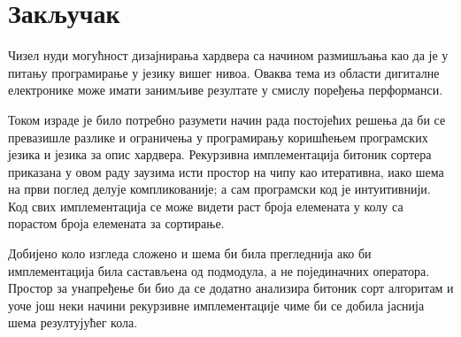 \documentclass[12pt, a4paper]{article}
\theoremstyle{definition}
\begin{document}
\newpage
\section{Закључак}

Чизел нуди могућност дизајнирања хардвера са начином размишљања као да је у питању програмирање у језику вишег нивоа. Оваква тема из области дигиталне електронике може имати занимљиве резултате у смислу поређења перформанси.

Током израде је било потребно разумети начин рада постојећих решења да би се превазишле разлике и ограничења у програмирању коришћењем програмских језика и језика за опис хардвера.
Рекурзивна имплементација битоник сортера приказана у овом раду заузима исти простор на чипу као итеративна, иако шема на први поглед делује компликованије; а сам програмски код је интуитивнији. Код свих имплементација се може видети раст броја елемената у колу са порастом броја елемената за сортирање.

Добијено коло изгледа сложено и шема би била прегледнија ако би имплементација била састављена од подмодула, а не појединачних оператора. Простор за унапређење би био да се додатно анализира битоник сорт алгоритам и уоче још неки начини рекурзивне имплементације чиме би се добила јаснија шема резултујућег кола.



\clearpage
\begingroup
\raggedright
%
\end{document}
